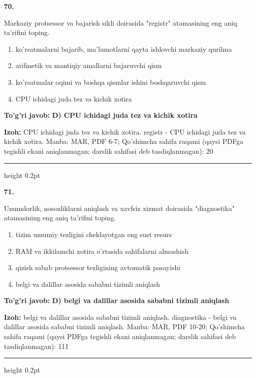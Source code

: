 \documentclass[10pt,a4paper]{article}
\begin{document}
{\bfseries\sffamily\color{ink} 70.}
\par
Markaziy protsessor va bajarish sikli doirasida "registr" atamasining eng aniq ta'rifini toping.
\begin{enumerate}[label=\Alph*),leftmargin=9mm]
\item ko'rsatmalarni bajarib, ma'lumotlarni qayta ishlovchi markaziy qurilma
\item arifmetik va mantiqiy amallarni bajaruvchi qism
\item ko'rsatmalar oqimi va boshqa qismlar ishini boshqaruvchi qism
\item CPU ichidagi juda tez va kichik xotira
\end{enumerate}
\begin{tcolorbox}[enhanced,breakable,colback=teal!4,colframe=teal!60!black,boxrule=0.45pt,arc=1.2mm,left=2.7mm,right=2.7mm,top=1.8mm,bottom=1.8mm,before skip=2mm,after skip=2mm]
{\bfseries\sffamily\color{teal}To'g'ri javob:} \textbf{D) CPU ichidagi juda tez va kichik xotira}
\par\smallskip
{\bfseries Izoh:} CPU ichidagi juda tez va kichik xotira. registr - CPU ichidagi juda tez va kichik xotira. Manba: MAR, PDF 6-7; Qo'shimcha sahifa raqami (qaysi PDFga tegishli ekani aniqlanmagan; darslik sahifasi deb tasdiqlanmagan): 20
\end{tcolorbox}
\vspace{2mm}\hrule height 0.2pt\vspace{3mm}

{\bfseries\sffamily\color{ink} 71.}
\par
Unumdorlik, nosozliklarni aniqlash va xavfsiz xizmat doirasida "diagnostika" atamasining eng aniq ta'rifini toping.
\begin{enumerate}[label=\Alph*),leftmargin=9mm]
\item tizim umumiy tezligini cheklayotgan eng sust resurs
\item RAM va ikkilamchi xotira o'rtasida sahifalarni almashish
\item qizish sabab protsessor tezligining avtomatik pasayishi
\item belgi va dalillar asosida sababni tizimli aniqlash
\end{enumerate}
\begin{tcolorbox}[enhanced,breakable,colback=teal!4,colframe=teal!60!black,boxrule=0.45pt,arc=1.2mm,left=2.7mm,right=2.7mm,top=1.8mm,bottom=1.8mm,before skip=2mm,after skip=2mm]
{\bfseries\sffamily\color{teal}To'g'ri javob:} \textbf{D) belgi va dalillar asosida sababni tizimli aniqlash}
\par\smallskip
{\bfseries Izoh:} belgi va dalillar asosida sababni tizimli aniqlash. diagnostika - belgi va dalillar asosida sababni tizimli aniqlash. Manba: MAR, PDF 10-20; Qo'shimcha sahifa raqami (qaysi PDFga tegishli ekani aniqlanmagan; darslik sahifasi deb tasdiqlanmagan): 111
\end{tcolorbox}
\vspace{2mm}\hrule height 0.2pt\vspace{3mm}
\end{document}
